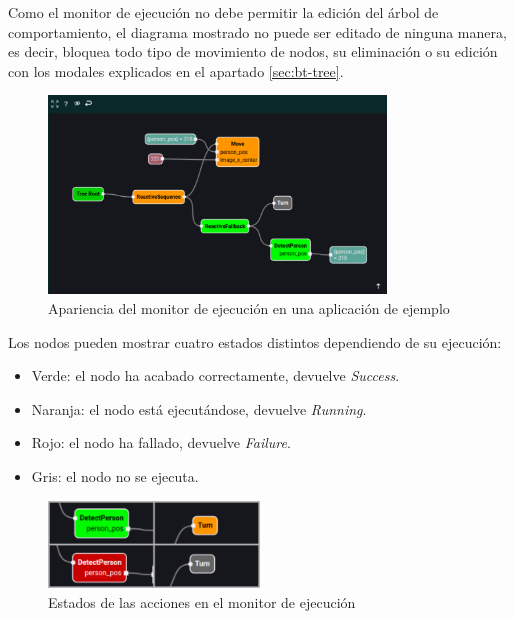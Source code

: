 Como el monitor de ejecución no debe permitir la edición del árbol de comportamiento, el diagrama mostrado no puede ser editado de ninguna manera, es decir, bloquea todo tipo de movimiento de nodos, su eliminación o su edición con los modales explicados en el apartado \ref{sec:bt-tree}.

\begin{figure}[H]
    \centering
    \includegraphics[width=0.8\textwidth]{figures/bt-avances/bt-monit.png}
    \caption{Apariencia del monitor de ejecución en una aplicación de ejemplo}
    \label{fig:bt-monit}
\end{figure}

Los nodos pueden mostrar cuatro estados distintos dependiendo de su ejecución:

\begin{itemize}
    \item Verde: el nodo ha acabado correctamente, devuelve \textit{Success}.
    \item Naranja: el nodo está ejecutándose, devuelve \textit{Running}.
    \item Rojo: el nodo ha fallado, devuelve \textit{Failure}.
    \item Gris: el nodo no se ejecuta.
\end{itemize}

\begin{figure}[H]
    \centering
    \includegraphics[width=0.5\textwidth]{figures/bt-avances/bt-monit-states.png}
    \caption{Estados de las acciones en el monitor de ejecución}
    \label{fig:bt-monit-state}
\end{figure}

